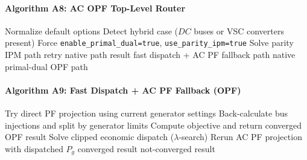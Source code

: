 \paragraph{Algorithm A8: AC OPF Top-Level Router}
\begin{algorithmic}[1]
  \State Normalize default options
  \State Detect hybrid case (\(DC\) buses or VSC converters present)
    \State Force \texttt{enable\_primal\_dual=true}, \texttt{use\_parity\_ipm=true}
  \EndIf
    \State Solve parity IPM path
     \State retry native path \EndIf
    \State \Return result
  \EndIf
    \State \Return fast dispatch + AC PF fallback path
  \EndIf
  \State \Return native primal-dual OPF path
\EndProcedure
\end{algorithmic}

\paragraph{Algorithm A9: Fast Dispatch + AC PF Fallback (OPF)}
\begin{algorithmic}[1]
  \State Try direct PF projection using current generator settings
    \State Back-calculate bus injections and split by generator limits
    \State Compute objective and return converged OPF result
  \EndIf
  \State Solve clipped economic dispatch (\(\lambda\)-search)
  \State Rerun AC PF projection with dispatched \(P_g\)
   \State \Return converged result \EndIf
  \State \Return not-converged result
\EndProcedure
\end{algorithmic}

